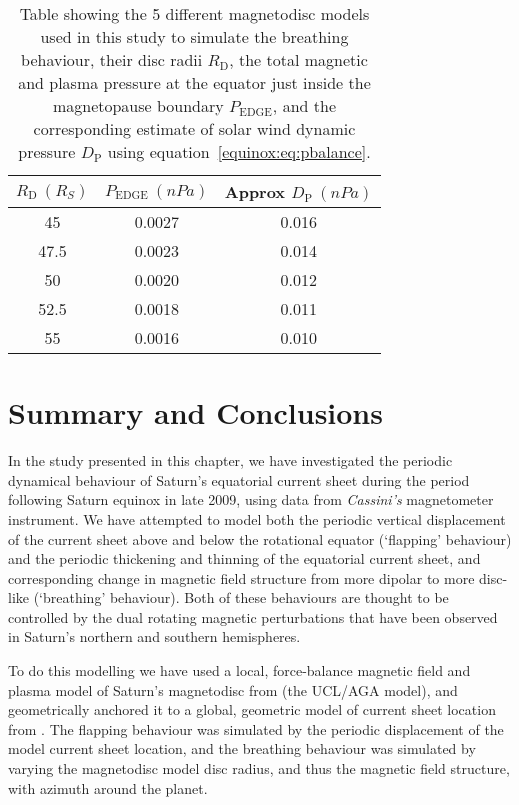 \begin{table}
\caption[Model radii and solar wind dynamic pressure estimates for breathing magnetodisc models.]{Table showing the 5 different magnetodisc models used in this study to simulate the breathing behaviour, their disc radii $R_\mathrm{D}$, the total magnetic and plasma pressure at the equator just inside the magnetopause boundary $P_\mathrm{EDGE}$, and the corresponding estimate of solar wind dynamic pressure $D_\mathrm{P}$ using equation~\ref{equinox:eq:pbalance}.}
\label{equinox:table:EdgePs}
\centering
\begin{tabular}{c c c}
\hline
$R_\mathrm{D}~(\si{R_S})$ & $P_\mathrm{EDGE}~(\si{nPa})$  & Approx $D_\mathrm{P}~(\si{nPa})$\\
\hline
45 & 0.0027 & 0.016 \\
47.5 & 0.0023 & 0.014\\
50 & 0.0020 & 0.012 \\
52.5 & 0.0018 & 0.011 \\
55 & 0.0016 & 0.010 \\
\hline
\end{tabular}
\end{table}

\section{Summary and Conclusions}\label{equinox:sec:conclusions}
In the study presented in this chapter, we have investigated the periodic dynamical behaviour of Saturn's equatorial current sheet during the period following Saturn equinox in late 2009, using data from \textit{Cassini's} magnetometer instrument. We have attempted to model both the periodic vertical displacement of the current sheet above and below the rotational equator (`flapping' behaviour) and the periodic thickening and thinning of the equatorial current sheet, and corresponding change in magnetic field structure from more dipolar to more disc-like (`breathing' behaviour). Both of these behaviours are thought to be controlled by the dual rotating magnetic perturbations that have been observed in Saturn's northern and southern hemispheres.

To do this modelling we have used a local, force-balance magnetic field and plasma model of Saturn's magnetodisc from \citet{achilleos2010a} (the UCL/AGA model), and geometrically anchored it to a global, geometric model of current sheet location from \citet{arridge2011}. The flapping behaviour was simulated by the periodic displacement of the model current sheet location, and the breathing behaviour was simulated by varying the magnetodisc model disc radius, and thus the magnetic field structure, with azimuth around the planet.

